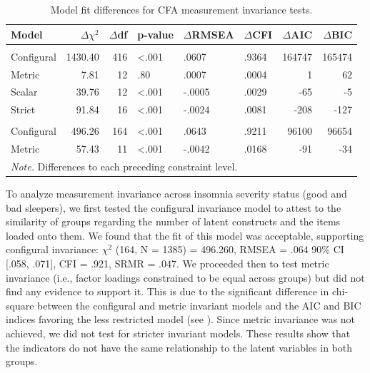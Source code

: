 \documentclass[
  12pt,
  twoside,
  openright,
  a4paper,
  chapter=TITLE,
  section=TITLE,
  brazil]{abntex2}
\begin{document}
\begin{table}

\caption{Model fit differences for CFA measurement invariance tests.}
\centering
\begin{tabular}[t]{lrrlllrr}
\toprule
Model & $\Delta\chi^2$ & $\Delta$df & p-value & $\Delta$RMSEA & $\Delta$CFI & $\Delta$AIC & $\Delta$BIC\\
\midrule
\addlinespace[0.3em]
\multicolumn{8}{l}{\textbf{Longitudinal invariance}}\\
\hspace{1em}Configural & 1430.40 & 416 & <.001 & .0607 & .9364 & 164747 & 165474\\
\hspace{1em}Metric & 7.81 & 12 & .80 & .0007 & .0004 & 1 & 62\\
\hspace{1em}Scalar & 39.76 & 12 & <.001 & -.0005 & .0029 & -65 & -5\\
\hspace{1em}Strict & 91.84 & 16 & <.001 & -.0024 & .0081 & -208 & -127\\
\addlinespace[0.3em]
\multicolumn{8}{l}{\textbf{Group invariance}}\\
\hspace{1em}Configural & 496.26 & 164 & <.001 & .0643 & .9211 & 96100 & 96654\\
\hspace{1em}Metric & 57.43 & 11 & <.001 & -.0042 & .0168 & -91 & -34\\
\bottomrule
\multicolumn{8}{l}{\rule{0pt}{1em}\textit{Note. } Differences to each preceding constraint level.}\\
\end{tabular}
\end{table}

To analyze measurement invariance across insomnia severity status (good
and bad sleepers), we first tested the configural invariance model to
attest to the similarity of groups regarding the number of latent
constructs and the items loaded onto them. We found that the fit of this
model was acceptable, supporting configural invariance: \(\chi^2\) (164,
N = 1385) = 496.260, RMSEA = .064 90\% CI {[}.058, .071{]}, CFI = .921,
SRMR = .047. We proceeded then to test metric invariance (i.e., factor
loadings constrained to be equal across groups) but did not find any
evidence to support it. This is due to the significant difference in
chi-square between the configural and metric invariant models and the
AIC and BIC indices favoring the less restricted model (see
\textcite{fit-differences}). Since metric invariance was not achieved,
we did not test for stricter invariant models. These results show that
the indicators do not have the same relationship to the latent variables
in both groups.
\end{document}
